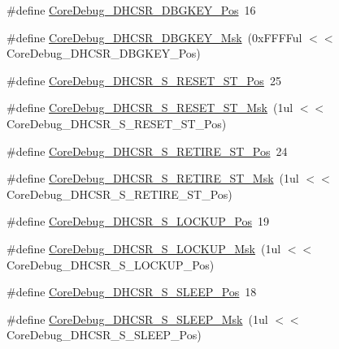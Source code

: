 \begin{DoxyCompactItemize}
\item 
\#define \mbox{\hyperlink{group___c_m_s_i_s___c_m3___core_debug_gac91280edd0ce932665cf75a23d11d842}{Core\+Debug\+\_\+\+D\+H\+C\+S\+R\+\_\+\+D\+B\+G\+K\+E\+Y\+\_\+\+Pos}}~16
\item 
\#define \mbox{\hyperlink{group___c_m_s_i_s___c_m3___core_debug_ga1ce997cee15edaafe4aed77751816ffc}{Core\+Debug\+\_\+\+D\+H\+C\+S\+R\+\_\+\+D\+B\+G\+K\+E\+Y\+\_\+\+Msk}}~(0x\+F\+F\+F\+Ful $<$$<$ Core\+Debug\+\_\+\+D\+H\+C\+S\+R\+\_\+\+D\+B\+G\+K\+E\+Y\+\_\+\+Pos)
\item 
\#define \mbox{\hyperlink{group___c_m_s_i_s___c_m3___core_debug_ga6f934c5427ea057394268e541fa97753}{Core\+Debug\+\_\+\+D\+H\+C\+S\+R\+\_\+\+S\+\_\+\+R\+E\+S\+E\+T\+\_\+\+S\+T\+\_\+\+Pos}}~25
\item 
\#define \mbox{\hyperlink{group___c_m_s_i_s___c_m3___core_debug_gac474394bcceb31a8e09566c90b3f8922}{Core\+Debug\+\_\+\+D\+H\+C\+S\+R\+\_\+\+S\+\_\+\+R\+E\+S\+E\+T\+\_\+\+S\+T\+\_\+\+Msk}}~(1ul $<$$<$ Core\+Debug\+\_\+\+D\+H\+C\+S\+R\+\_\+\+S\+\_\+\+R\+E\+S\+E\+T\+\_\+\+S\+T\+\_\+\+Pos)
\item 
\#define \mbox{\hyperlink{group___c_m_s_i_s___c_m3___core_debug_ga2328118f8b3574c871a53605eb17e730}{Core\+Debug\+\_\+\+D\+H\+C\+S\+R\+\_\+\+S\+\_\+\+R\+E\+T\+I\+R\+E\+\_\+\+S\+T\+\_\+\+Pos}}~24
\item 
\#define \mbox{\hyperlink{group___c_m_s_i_s___c_m3___core_debug_ga89dceb5325f6bcb36a0473d65fbfcfa6}{Core\+Debug\+\_\+\+D\+H\+C\+S\+R\+\_\+\+S\+\_\+\+R\+E\+T\+I\+R\+E\+\_\+\+S\+T\+\_\+\+Msk}}~(1ul $<$$<$ Core\+Debug\+\_\+\+D\+H\+C\+S\+R\+\_\+\+S\+\_\+\+R\+E\+T\+I\+R\+E\+\_\+\+S\+T\+\_\+\+Pos)
\item 
\#define \mbox{\hyperlink{group___c_m_s_i_s___c_m3___core_debug_ga2900dd56a988a4ed27ad664d5642807e}{Core\+Debug\+\_\+\+D\+H\+C\+S\+R\+\_\+\+S\+\_\+\+L\+O\+C\+K\+U\+P\+\_\+\+Pos}}~19
\item 
\#define \mbox{\hyperlink{group___c_m_s_i_s___c_m3___core_debug_ga7b67e4506d7f464ef5dafd6219739756}{Core\+Debug\+\_\+\+D\+H\+C\+S\+R\+\_\+\+S\+\_\+\+L\+O\+C\+K\+U\+P\+\_\+\+Msk}}~(1ul $<$$<$ Core\+Debug\+\_\+\+D\+H\+C\+S\+R\+\_\+\+S\+\_\+\+L\+O\+C\+K\+U\+P\+\_\+\+Pos)
\item 
\#define \mbox{\hyperlink{group___c_m_s_i_s___c_m3___core_debug_ga349ccea33accc705595624c2d334fbcb}{Core\+Debug\+\_\+\+D\+H\+C\+S\+R\+\_\+\+S\+\_\+\+S\+L\+E\+E\+P\+\_\+\+Pos}}~18
\item 
\#define \mbox{\hyperlink{group___c_m_s_i_s___c_m3___core_debug_ga98d51538e645c2c1a422279cd85a0a25}{Core\+Debug\+\_\+\+D\+H\+C\+S\+R\+\_\+\+S\+\_\+\+S\+L\+E\+E\+P\+\_\+\+Msk}}~(1ul $<$$<$ Core\+Debug\+\_\+\+D\+H\+C\+S\+R\+\_\+\+S\+\_\+\+S\+L\+E\+E\+P\+\_\+\+Pos)
$$
\end{DoxyCompactItemize}
